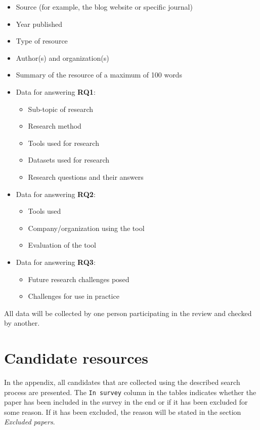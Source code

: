 \documentclass[]{book}
\providecommand{\tightlist}{%
  \setlength{\itemsep}{0pt}\setlength{\parskip}{0pt}}
\begin{document}
\begin{itemize}
\tightlist
\item
  Source (for example, the blog website or specific journal)
\item
  Year published
\item
  Type of resource
\item
  Author(s) and organization(s)
\item
  Summary of the resource of a maximum of 100 words
\item
  Data for answering \textbf{RQ1}:

  \begin{itemize}
  \tightlist
  \item
    Sub-topic of research
  \item
    Research method
  \item
    Tools used for research
  \item
    Datasets used for research
  \item
    Research questions and their answers
  \end{itemize}
\item
  Data for answering \textbf{RQ2}:

  \begin{itemize}
  \tightlist
  \item
    Tools used
  \item
    Company/organization using the tool
  \item
    Evaluation of the tool
  \end{itemize}
\item
  Data for answering \textbf{RQ3}:

  \begin{itemize}
  \tightlist
  \item
    Future research challenges posed
  \item
    Challenges for use in practice
  \end{itemize}
\end{itemize}

All data will be collected by one person participating in the review and
checked by another.

\section{Candidate resources}\label{candidate-resources}

In the appendix, all candidates that are collected using the described
search process are presented. The \texttt{In\ survey} column in the
tables indicates whether the paper has been included in the survey in
the end or if it has been excluded for some reason. If it has been
excluded, the reason will be stated in the section \emph{Excluded
papers}.
\end{document}
